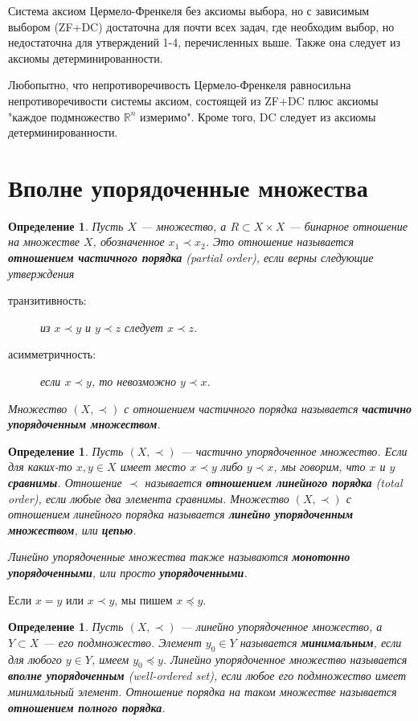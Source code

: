 \documentclass[12pt]{book}
\def\R{{\mathbb R}}
\theoremstyle{upshape}
\theoremstyle{generic}
\newtheorem{opredelenie}[teorema]{Определение}
\def\еза{\end{remark}}
\theoremstyle{upshapenonumber}
\newcommand{\следствие}{%
     \refstepcounter{teorema}
     {\noindent\bf Следствие \thechapter.\arabic{teorema}:\ }}
\newcommand{\пример}{%
     \refstepcounter{teorema}
     {\noindent\bf Пример \thechapter.\arabic{teorema}:\ }}
\newcommand{\лемма}{%
     \refstepcounter{teorema}
     {\noindent\bf Лемма \thechapter.\arabic{teorema}:\ }}
\newcommand{\теорема}{%
     \refstepcounter{teorema}
     {\noindent\bf Теорема \thechapter.\arabic{teorema}:\ }}
\newcommand{\утверждение}{%
     \refstepcounter{teorema}
     {\noindent\bf Утверждение \thechapter.\arabic{teorema}:\ }}
\def\бф{\bf}
\def\ем{\em}
\def\ез{\end{zadacha}}
\def\еу{\end{ukazanie}}
\def\определение{\begin{opredelenie}}
\def\ео{\end{opredelenie}}
\def\енум{\begin{enumerate}}
\def\ее{\end{enumerate}}
\begin{document}
Система аксиом Цермело-Френкеля без аксиомы
выбора, но с зависимым выбором (ZF+DC)
достаточна для почти всех задач,
где необходим выбор, но недостаточна 
для утверждений 1-4, перечисленных выше. 
Также она следует из аксиомы детерминированности.

Любопытно, что непротиворечивость
Цермело-Френкеля равносильна
непротиворечивости системы аксиом,
состоящей из ZF+DC плюс аксиомы
"каждое подмножество $\R^n$
измеримо". Кроме того, DC следует 
из аксиомы детерминированности.


\section{Вполне упорядоченные множества}


\определение
Пусть $X$ --- множество, а $R\subset X\times X$ --- бинарное
отношение на множестве $X$, обозначенное $x_1 \prec x_2$.
Это отношение называется {\бф отношением частичного
порядка} (partial order), если верны следующие утверждения
\begin{description}
\item[транзитивность:] из $x\prec y$ и $y\prec z$ следует
$x\prec z$.
\item[асимметричность:] если $x\prec y$, то невозможно
$y\prec x$.
\end{description}
Множество $(X, \prec)$ с отношением частичного
порядка называется {\bf частично упорядоченным множеством}.
\ео

\определение
Пусть $(X, \prec)$ --- частично
упорядоченное множество. Если для каких-то $x, y\in X$ имеет
место  $x\prec y$ либо $y\prec x$, мы говорим,
что $x$ и $y$ {\бф сравнимы}.
Отношение $\prec$ называется {\бф отношением линейного
порядка} (total order), если любые два элемента сравнимы. Множество
$(X, \prec)$ с отношением линейного порядка
называется {\бф линейно упорядоченным множеством}, или {\бф цепью}.

Линейно упорядоченные множества также называются
{\бф монотонно упорядоченными}, или просто {\бф упорядоченными}.
\ео

Если $x=y$ или $x\prec y$, мы пишем $x\preccurlyeq y$.


\определение
Пусть $(X, \prec)$ --- линейно
упорядоченное множество, а $Y \subset X$ --- его
подмножество. Элемент $y_0\in Y$ называется {\бф
минимальным}, если  для любого $y\in Y$, 
имеем $y_0\preccurlyeq y$. Линейно упорядоченное
множество называется {\бф вполне упорядоченным}
(well-ordered set),
если любое его подмножество имеет минимальный
элемент. Отношение порядка на таком множестве
называется {\бф отношением полного порядка}.
\ео
\end{document}
